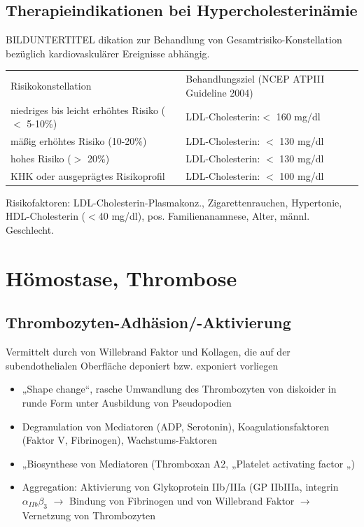 \documentclass[10pt,a4paper]{report}
\begin{document}
\section{Therapieindikationen bei Hypercholesterinämie} %
\label{sec:therapieindikationen_bei_hypercholesterin_mie}
BILDUNTERTITEL dikation zur Behandlung von Gesamtrisiko-Konstellation bezüglich 	kardiovaskulärer Ereignisse abhängig.\\
\begin{tabularx}{\textwidth}{XX}
Risikokonstellation&Behandlungsziel (NCEP ATPIII Guideline 2004)\\
niedriges bis leicht erhöhtes Risiko ($<$ 5-10\%)	&LDL-Cholesterin:$<$ 160 mg/dl\\
mäßig erhöhtes Risiko (10-20\%)&LDL-Cholesterin: $<$ 130 mg/dl\\
hohes Risiko ($>$ 20\%)&LDL-Cholesterin: $<$ 130 mg/dl\\
KHK oder ausgeprägtes Risikoprofil&LDL-Cholesterin: $<$ 100 mg/dl\\
\end{tabularx}
Risikofaktoren: LDL-Cholesterin-Plasmakonz., Zigarettenrauchen, Hypertonie, HDL-Cholesterin ($<$40 mg/dl), pos. Familienanamnese, Alter, männl. Geschlecht.
\chapter{Hömostase, Thrombose} %
\label{cha:h_mostase_thrombose}
\section{Thrombozyten-Adhäsion/-Aktivierung} %
\label{sec:thrombozyten_adh_sion_aktivierung}
Vermittelt durch von Willebrand Faktor und Kollagen, die auf der subendothelialen Oberfläche deponiert bzw. exponiert vorliegen
\begin{itemize}
	\item „Shape change“, rasche Umwandlung des Thrombozyten von diskoider in runde Form unter Ausbildung von Pseudopodien
	\item Degranulation von Mediatoren (ADP, Serotonin), Koagulationsfaktoren (Faktor V, Fibrinogen), Wachstums-Faktoren
	\item „Biosynthese von Mediatoren (Thromboxan A2, „Platelet activating factor „)
	\item Aggregation: Aktivierung von Glykoprotein IIb/IIIa (GP IIbIIIa, integrin $\alpha_{IIb}\beta_3$ $\rightarrow$ Bindung von Fibrinogen und von Willebrand Faktor $\rightarrow$ Vernetzung von Thrombozyten 
\end{itemize}
\end{document}
